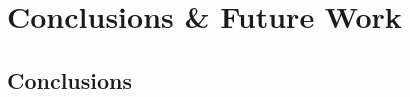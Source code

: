 \chapter{Conclusions \& Future Work}
\label{cha:conclusion}

\section{Conclusions}
\label{sec:con_conclusions}





